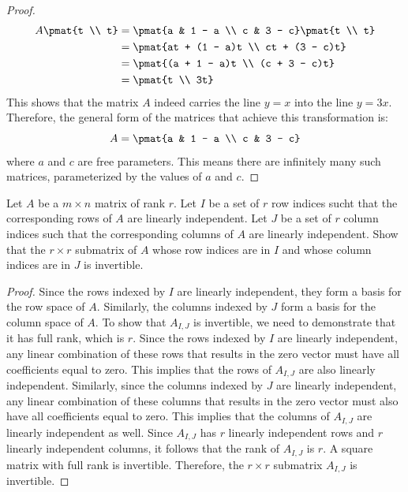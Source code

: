 \documentclass[openany]{book}
\begin{document}
\begin{proof}
\[\begin{aligned}
A \pmat{t \\ t} &= \pmat{a & 1 - a \\ c & 3 - c} \pmat{t \\ t} \\
&= \pmat{at + (1 - a)t \\ ct + (3 - c)t} \\
&= \pmat{(a + 1 - a)t \\ (c + 3 - c)t} \\
&= \pmat{t \\ 3t}
\end{aligned}\]
This shows that the matrix $A$ indeed carries the line $y = x$ into the line $y = 3x$. Therefore, the general form of the matrices that achieve this transformation is:
$$A = \pmat{a & 1 - a \\ c & 3 - c}$$
where $a$ and $c$ are free parameters. This means there are infinitely many such matrices, parameterized by the values of $a$ and $c$.
\end{proof}
\begin{exercise}
    Let $A$ be a $m \times n$ matrix of rank $r$. Let $I$ be a set of $r$ row indices sucht that the corresponding rows of $A$ are linearly independent. Let $J$ be a set of $r$ column indices such that the corresponding columns of $A$ are linearly independent. Show that the $r \times r$ submatrix of $A$ whose row indices are in $I$ and whose column indices are in $J$ is invertible.
\end{exercise}
\begin{proof}
Since the rows indexed by $I$ are linearly independent, they form a basis for the row space of $A$. Similarly, the columns indexed by $J$ form a basis for the column space of $A$.
To show that $A_{I,J}$ is invertible, we need to demonstrate that it has full rank, which is $r$. Since the rows indexed by $I$ are linearly independent, any linear combination of these rows that results in the zero vector must have all coefficients equal to zero. This implies that the rows of $A_{I,J}$ are also linearly independent.
Similarly, since the columns indexed by $J$ are linearly independent, any linear combination of these columns that results in the zero vector must also have all coefficients equal to zero. This implies that the columns of $A_{I,J}$ are linearly independent as well.
Since $A_{I,J}$ has $r$ linearly independent rows and $r$ linearly independent columns, it follows that the rank of $A_{I,J}$ is $r$. A square matrix with full rank is invertible. Therefore, the $r \times r$ submatrix $A_{I,J}$ is invertible.
\end{proof}
\end{document}
